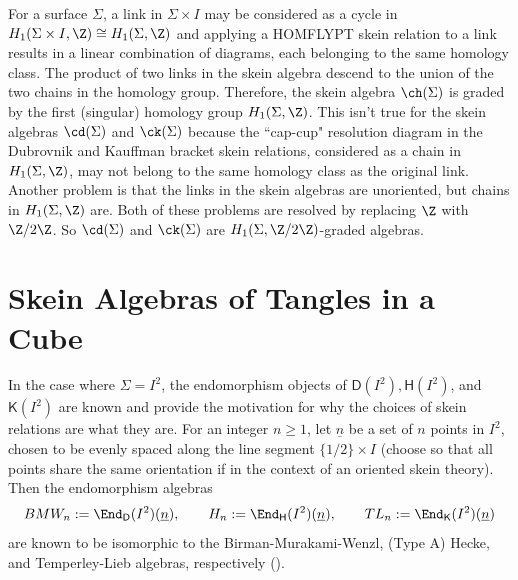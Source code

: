 \begin{remark}
For a surface $\Sigma$, a link in $\Sigma \times I$ may be considered as a cycle in $H_1(\Sigma \times I, \Z) \cong H_1(\Sigma, \Z)$ and applying a HOMFLYPT skein relation to a link results in a linear combination of diagrams, each belonging to the same homology class. The product of two links in the skein algebra descend to the union of the two chains in the homology group. Therefore, the skein algebra $\ch(\Sigma)$ is graded by the first (singular) homology group $H_1(\Sigma, \Z)$. This isn't true for the skein algebras $\cd(\Sigma)$ and $\ck(\Sigma)$ because the ``cap-cup" resolution diagram in the Dubrovnik and Kauffman bracket skein relations, considered as a chain in $H_1(\Sigma, \Z)$, may not belong to the same homology class as the original link. Another problem is that the links in the skein algebras are unoriented, but chains in $H_1(\Sigma, \Z)$ are. Both of these problems are resolved by replacing $\Z$ with $\Z/2\Z$. So $\cd(\Sigma)$ and $\ck(\Sigma)$ are $H_1(\Sigma, \Z/2\Z)$-graded algebras. 
\end{remark}

\section{Skein Algebras of Tangles in a Cube} \label{sec:cube}

In the case where $\Sigma = I^2$, the endomorphism objects of $\mathsf{D}(I^2), \mathsf{H}(I^2)$, and $\mathsf{K}(I^2)$ are known and provide the motivation for why the choices of skein relations are what they are. For an integer $n \geq 1$, let $\underline{n}$ be a set of $n$ points in $I^2$, chosen to be evenly spaced along the line segment $\{ 1/2 \} \times I$ (choose so that all points share the same orientation if in the context of an oriented skein theory). Then the endomorphism algebras 
\[
BMW_n := \End_\mathsf{D}(I^2)(\underline{n}), \qquad H_n := \End_\mathsf{H}(I^2)(\underline{n}), \qquad TL_n := \End_\mathsf{K}(I^2)(\underline{n})
\]
are known to be isomorphic to the Birman-Murakami-Wenzl, (Type A) Hecke, and Temperley-Lieb algebras, respectively (). 

